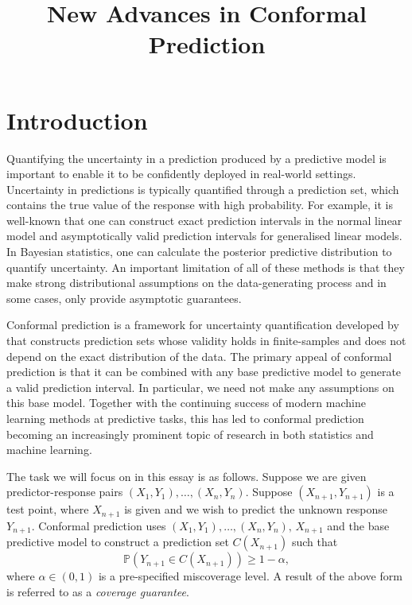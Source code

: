 \documentclass[11pt, titlepage]{article} %
\title{New Advances in Conformal Prediction}
\newcommand{\Prob}[1]{\mathbb{P}\left( #1 \right)}
\numberwithin{equation}{section}
\theoremstyle{definition}
\numberwithin{theorem}{section}
\numberwithin{lemma}{section}
\numberwithin{corollary}{section}
\numberwithin{proposition}{section}
\numberwithin{definition}{section}
\numberwithin{remark}{section}
\begin{document}
\maketitle


\section{Introduction}
\label{sec:intro}

Quantifying the uncertainty in a prediction produced by a predictive model is important to enable it to be confidently deployed in real-world settings. Uncertainty in predictions is typically quantified through a prediction set, which contains the true value of the response with high probability. For example, it is well-known that one can construct exact prediction intervals in the normal linear model and asymptotically valid prediction intervals for generalised linear models. In Bayesian statistics, one can calculate the posterior predictive distribution to quantify uncertainty. An important limitation of all of these methods is that they make strong distributional assumptions on the data-generating process and in some cases, only provide asymptotic guarantees. \vskip5pt

\noindent
Conformal prediction is a framework for uncertainty quantification developed by \cite{vovk2005algorithmic} that constructs prediction sets whose validity holds in finite-samples and does not depend on the exact distribution of the data. The primary appeal of conformal prediction is that it can be combined with any base predictive model to generate a valid prediction interval. In particular, we need not make any assumptions on this base model. Together with the continuing success of modern machine learning methods at predictive tasks, this has led to conformal prediction becoming an increasingly prominent topic of research in both statistics and machine learning. \vskip5pt

\noindent
The task we will focus on in this essay is as follows. Suppose we are given predictor-response pairs \((X_1, Y_1), \ldots, (X_n, Y_n)\). Suppose \((X_{n+1}, Y_{n+1})\) is a test point, where \(X_{n+1}\) is given and we wish to predict the unknown response \(Y_{n+1}\). Conformal prediction uses \((X_1, Y_1), \ldots, (X_n, Y_n), \, X_{n+1}\) and the base predictive model to construct a prediction set \(C(X_{n+1})\) such that \begin{equation}
    \Prob{Y_{n+1} \in C(X_{n+1})} \geq 1-\alpha,
\label{eqn:basic_coverage_guarantee}
\end{equation} where \(\alpha \in (0,1) \) is a pre-specified miscoverage level. A result of the above form is referred to as a \textit{coverage guarantee}.  \vskip5pt 
\end{document}
